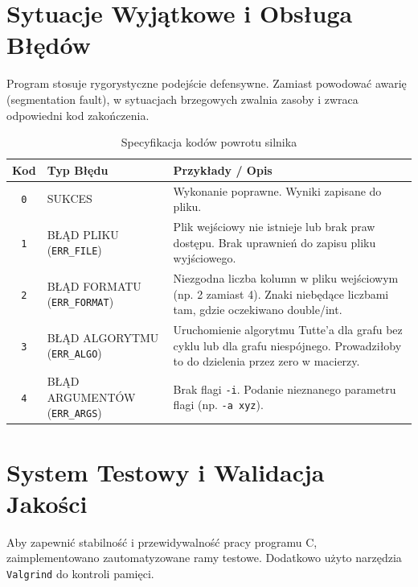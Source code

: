 \documentclass[12pt,a4paper]{article}
\begin{document}
\section{Sytuacje Wyjątkowe i Obsługa Błędów}

Program stosuje rygorystyczne podejście defensywne. Zamiast powodować awarię (segmentation fault), w sytuacjach brzegowych zwalnia zasoby i zwraca odpowiedni kod zakończenia.

\begin{table}[H]
\centering
\begin{tabularx}{\textwidth}{|c|l|X|}
\hline
\textbf{Kod} & \textbf{Typ Błędu} & \textbf{Przykłady / Opis} \\ \hline
\texttt{0} & SUKCES & Wykonanie poprawne. Wyniki zapisane do pliku. \\ \hline
\texttt{1} & BŁĄD PLIKU (\texttt{ERR\_FILE}) & Plik wejściowy nie istnieje lub brak praw dostępu. Brak uprawnień do zapisu pliku wyjściowego. \\ \hline
\texttt{2} & BŁĄD FORMATU (\texttt{ERR\_FORMAT})& Niezgodna liczba kolumn w pliku wejściowym (np. 2 zamiast 4). Znaki niebędące liczbami tam, gdzie oczekiwano double/int. \\ \hline
\texttt{3} & BŁĄD ALGORYTMU (\texttt{ERR\_ALGO})& Uruchomienie algorytmu Tutte'a dla grafu bez cyklu lub dla grafu niespójnego. Prowadziłoby to do dzielenia przez zero w macierzy. \\ \hline
\texttt{4} & BŁĄD ARGUMENTÓW (\texttt{ERR\_ARGS})& Brak flagi \texttt{-i}. Podanie nieznanego parametru flagi (np. \texttt{-a xyz}). \\ \hline
\end{tabularx}
\caption{Specyfikacja kodów powrotu silnika}
\end{table}

\section{System Testowy i Walidacja Jakości}

Aby zapewnić stabilność i przewidywalność pracy programu C, zaimplementowano zautomatyzowane ramy testowe. Dodatkowo użyto narzędzia \texttt{Valgrind} do kontroli pamięci.
\end{document}
